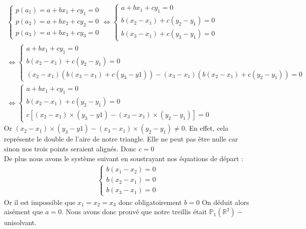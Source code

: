 \begin{align*}
\left\{\begin{matrix}
p\left(a_1\right)=a+bx_1+cy_1=0\\
p\left(a_2\right)=a+bx_2+cy_2=0\\
p\left(a_3\right)=a+bx_3+cy_3=0
\end{matrix}\right.\Leftrightarrow\left\{\begin{matrix}
a+bx_1+cy_1=0\\
b(x_2-x_1)+c(y_2-y_1)=0\\
b(x_3-x_1)+c(y_3-y_1)=0
\end{matrix}\right.\\
\Leftrightarrow\left\{\begin{matrix}
a+bx_1+cy_1=0\\
b(x_2-x_1)+c(y_2-y_1)=0\\
(x_2-x_1)\left(b(x_3-x_1)+c(y_3-y1)\right)-(x_3-x_1)\left(b(x_2-x_1)+c(y_2-y_1)\right)=0
\end{matrix}\right.\\
\Leftrightarrow\left\{\begin{matrix}
a+bx_1+cy_1=0\\
b(x_2-x_1)+c(y_2-y_1)=0\\
c\left[(x_2-x_1)\times (y_3-y1)-(x_3-x_1)\times(y_2-y_1)\right]=0
\end{matrix}\right.
\end{align*}
Or $(x_2-x_1)\times (y_3-y1)-(x_3-x_1)\times(y_2-y_1) \neq 0$. En effet, cela représente le double de l'aire de notre triangle. Elle ne peut pas \^etre nulle car sinon nos trois points seraient alignés. Donc $c=0$\\
De plus nous avons le système suivant en soustrayant nos équations de départ :
\begin{align*}
\left\{\begin{matrix}
b(x_1-x_2)=0\\
b(x_2-x_1)=0\\
b(x_3-x_1)=0
\end{matrix}\right.
\end{align*}
Or il est impossible que $x_1=x_2=x_3$ donc obligatoirement $b=0$ On déduit alors aisément que $a=0$. Nous avons donc prouvé que notre treillis était $\mathbb{P}_1\left(\mathbb{R}^2\right)-$unisolvant.\\


